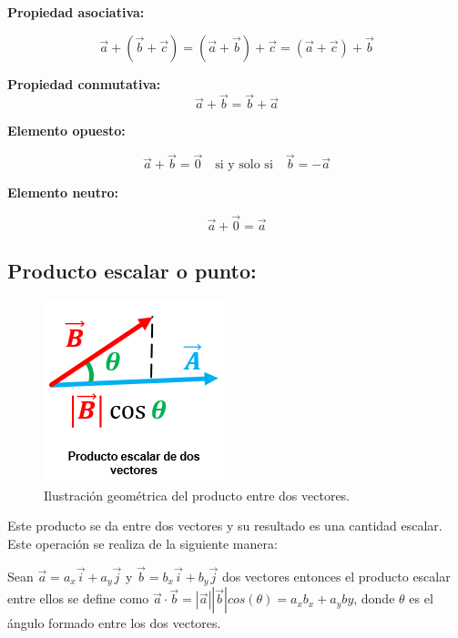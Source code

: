 \textbf{Propiedad asociativa:}

\begin{equation}
 \vec{a} + (\vec{b} + \vec{c}) = (\vec{a} + \vec{b}) + \vec{c} = (\vec{a} + \vec{c}) +\vec{b} 
 \end{equation}

\textbf{Propiedad conmutativa:}
\begin{equation}
 \vec{a} + \vec{b} = \vec{b} + \vec{a}
\end{equation}

\textbf{Elemento opuesto:}

\begin{equation}
 \vec{a} + \vec{b} = \vec{0} \quad \text{si y solo si}\quad \vec{b} =-\vec{a} 
\end{equation}

\textbf{Elemento neutro:}

\begin{equation}
 \vec{a} + \vec{0} = \vec{a} 
\end{equation}

\subsection{Producto escalar o punto:}

\begin{figure}[ht]
 \centering
 \includegraphics[scale=0.7]{images/productoescalar.png}
 \caption{Ilustración geométrica del producto entre dos vectores.}
 \label{fig:escalar}
\end{figure}

Este producto se da entre dos vectores y su resultado es una cantidad escalar. Este operación se realiza de la 
siguiente manera:

\begin{tcolorbox}
Sean $\vec{a} =a_x\vec{i}+a_y\vec{j}$ y $\vec{b}=b_x\vec{i}+b_y\vec{j}$ dos vectores entonces el producto escalar 
entre ellos se define como $\vec{a}\cdot\vec{b}=|\vec{a}||\vec{b}|cos(\theta)= a_xb_x+a_yby$, donde $\theta$ es el 
ángulo formado entre los dos vectores.
\end{tcolorbox}

